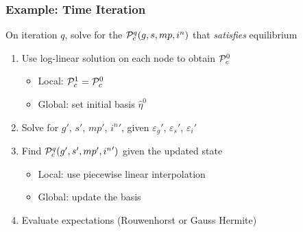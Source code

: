\documentclass[11pt]{beamer}
\newcounter{savedenumi}
\begin{document}
\begin{frame}\frametitle{Example: Time Iteration}

On iteration $q$, solve for the ${\cal P}_c^q(g,s,mp,i^n)$ that \textit{satisfies} equilibrium
\begin{enumerate}\setlength{\itemsep}{12pt}
  \item<1-|handout:1> Use log-linear solution on each node to obtain ${\cal P}_c^0$
  \begin{itemize}
    \item Local: ${\cal P}_c^1={\cal P}_c^0$
    \item Global: set initial basis $\hat{\eta}^0$%
  \end{itemize}
  \item<2-|handout:1> Solve for $g'$, $s'$, $mp'$, ${i^n}'$, given $\varepsilon_g'$, $\varepsilon_s'$, $\varepsilon_i'$ \label{updated vars}
  \item<3-|handout:1> Find ${\cal P}_c^q(g',s',mp',{i^n}')$ given the updated state
  \begin{itemize}
    \item Local: use piecewise linear interpolation
    \item Global: update the basis %
  \end{itemize}
  \item<4-|handout:1> Evaluate expectations (Rouwenhorst or Gauss Hermite) \label{expectation}
\end{enumerate}

\end{frame}
\setcounter{savedenumi}{\value{enumi}}

\end{document}
